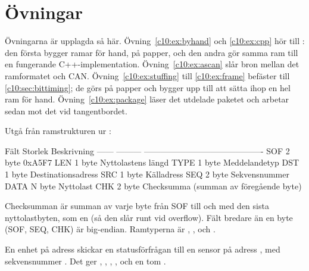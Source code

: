 
\section{Övningar}
\label{c10:sec:exercises}

\begin{aside}
Övningarna är upplagda så här. Övning~\ref{c10:ex:byhand} och \ref{c10:ex:cpp} hör till
: den första bygger ramar för hand, på papper, och den andra gör samma ram
till en fungerande C++-implementation. Övning~\ref{c10:ex:ascan} slår bron mellan det ramformatet och
CAN. Övning~\ref{c10:ex:stuffing} till \ref{c10:ex:frame} befäster  till
\ref{c10:sec:bittiming}; de görs på papper och bygger upp till att sätta ihop en hel ram för hand.
Övning~\ref{c10:ex:package} läser det utdelade paketet  och arbetar sedan mot det vid
tangentbordet.
\end{aside}


\label{c10:ex:byhand}
Utgå från ramstrukturen ur :

\begin{textdrawing}
Fält   Storlek   Beskrivning
------ --------- -------------------------------------------
SOF    2 byte    0xA5F7
LEN    1 byte    Nyttolastens längd
TYPE   1 byte    Meddelandetyp
DST    1 byte    Destinationsadress
SRC    1 byte    Källadress
SEQ    2 byte    Sekvensnummer
DATA   N byte    Nyttolast
CHK    2 byte    Checksumma (summan av föregående byte)
\end{textdrawing}

Checksumman är summan av varje byte från SOF till och med den sista nyttolastbyten, som en
 (så den slår runt vid overflow). Fält bredare än en byte (SOF, SEQ, CHK) är
big-endian. Ramtyperna är , ,  och
.

En enhet på adress  skickar en statusförfrågan till en sensor på adress , med
sekvensnummer . Det ger , , ,
, och en tom .

